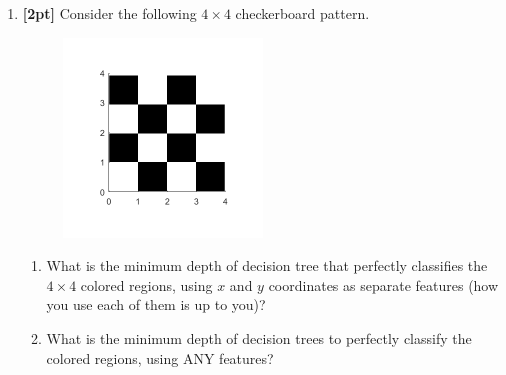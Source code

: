 \begin{enumerate}
    \newpage
    \item \textbf{[2pt]} Consider the following $4\times 4$ checkerboard pattern. 
    \begin{figure}[H]
        \centering
        \includegraphics[width = 0.5\textwidth]{checkerboard.png}
        \label{Q_2dt}
    \end{figure}
    \begin{enumerate}
        \item What is the minimum depth of decision tree that perfectly classifies the $4\times 4$ colored regions, using $x$ and $y$ coordinates as separate features (how you use each of them is up to you)?
    \item What is the minimum depth of decision trees to perfectly classify the colored regions, using ANY features?
    \end{enumerate}
    

\end{enumerate}
